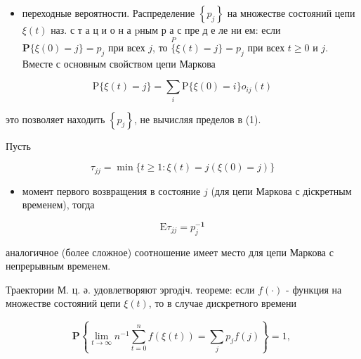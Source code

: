 \documentclass[10pt]{article}
\begin{document}
\begin{itemize}

  \item переходные вероятности. Распределение $\left\{p_{j}\right\}$ на множестве состояний цепи $\xi(t)$ наз. с т а ц и о н а pным р а с пре д е ле ни ем: если $\mathbf{P}\{\xi(0)=j\}=p_{j}$ при всех $j$, то $\stackrel{P}{\{} \xi(t)=j\}=p_{j}$ при всех $t \geqslant 0$ и $j$. Вместе с основным свойством цепи Маркова

\end{itemize}



\[

\mathrm{P}\{\xi(t)=j\}=\sum_{i} \mathrm{P}\{\xi(0)=i\} o_{i j}(t)

\]



это позволяет находить $\left\{p_{j}\right\}$, не вычисляя пределов в (1).



Пусть



\[

\tau_{j j}=\min \{t \geqslant 1: \xi(t)=j(\xi(0)=j)\}

\]



\begin{itemize}

  \item момент первого возвращения в состояние $j$ (для цепи Маркова с діскретным временем), тогда

\end{itemize}



\[

\mathrm{E} \tau_{j j}=p_{j}^{-\mathbf{1}}

\]



аналогичное (более сложное) соотношение имеет место для цепи Маркова с непрерывным временем.



Траектории М. ц. ә. удовлетворяют эргодіч. теореме: если $f(\cdot)$ - функция на множестве состояний цепи $\xi(t)$, то в случае дискретного времени



\[

\mathbf{P}\left\{\lim _{t \rightarrow \infty} n^{-1} \sum_{t=0}^{n} f(\xi(t))=\sum_{j} p_{j} f(j)\right\}=1 \text {, }

\]
\end{document}
